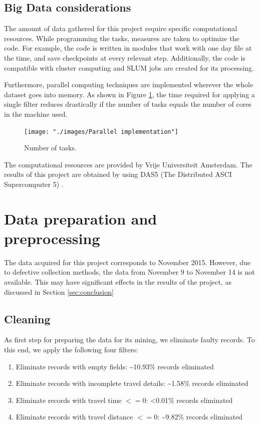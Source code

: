 \documentclass{article}
\begin{document}
\subsection{Big Data considerations}
The amount of data gathered for this project require specific computational resources. While programming the tasks, measures are taken to optimize the code. For example, the code is written in modules that work with one day file at the time, and save checkpoints at every relevant step. Additionally, the code is compatible with cluster computing and SLUM jobs are created for its processing.

Furthermore, parallel computing techniques are implemented wherever the whole dataset goes into memory. As shown in Figure \ref{fig:bigdata/parallel}, the time required for applying a single filter reduces drastically if the number of tasks equals the number of cores in the machine used. 

\begin{figure}[H]
  \centering
  \texttt{[image: "./images/Parallel implementation"]}
  \caption{Number of tasks.}
  \label{fig:bigdata/parallel}
\end{figure}

The computational resources are provided by Vrije Universiteit Amsterdam. The results of this project are obtained by using DAS5 (The Distributed ASCI Supercomputer 5) \cite{bal2016medium}. 

\newpage
\section{Data preparation and preprocessing}
\label{sec:partI}
The data acquired for this project corresponds to November 2015. However, due to defective collection methods, the data from November 9 to November 14 is not available. This may have significant effects in the results of the project, as discussed in Section \ref{sec:conclusion}

\subsection{Cleaning}
As first step for preparing the data for its mining, we eliminate faulty records. To this end, we apply the following four filters:

\begin{enumerate}
\item Eliminate records with empty fields: \textasciitilde 10.93\% records eliminated
\item Eliminate records with incomplete travel details: \textasciitilde 1.58\% records eliminated
\item Eliminate records with travel time $<= 0$: <0.01\% records eliminated
\item Eliminate records with travel distance $<= 0$: \textasciitilde 9.82\% records eliminated
\end{enumerate}
\end{document}
